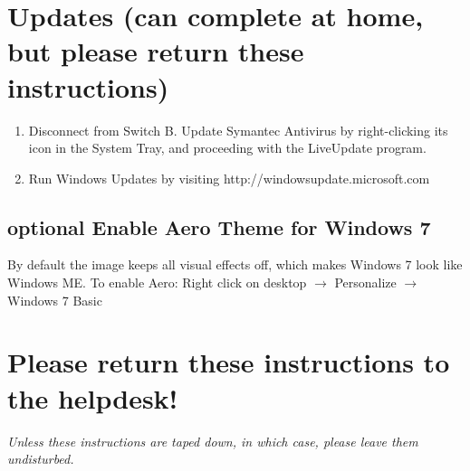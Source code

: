 \documentclass[10pt]{article}
\begin{document}
\section{Updates (can complete at home, but please return these instructions)}
\begin{enumerate}
\item Disconnect from Switch B. Update Symantec Antivirus by right-clicking its icon in the System Tray, and proceeding with the LiveUpdate program.
\item Run Windows Updates by visiting http://windowsupdate.microsoft.com
\end{enumerate}
\subsection{{\sc optional} Enable Aero Theme for Windows 7}
By default the image keeps all visual effects off, which makes Windows 7 look like Windows ME. To enable Aero:
Right click on desktop $\rightarrow$ Personalize $\rightarrow$ Windows 7 Basic
\section{Please return these instructions to the helpdesk!}
\emph{Unless these instructions are taped down, in which case, please leave them undisturbed.}
\end{document}
